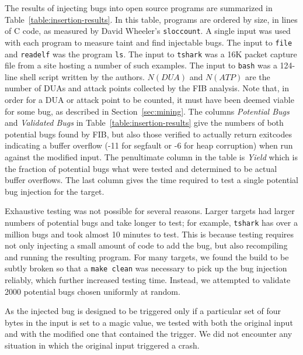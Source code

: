 The results of injecting bugs into open source programs are summarized in Table~\ref{table:insertion-results}.
In this table, programs are ordered by size, in lines of C code, as measured by David Wheeler's \verb+sloccount+.
A single input was used with each program to measure taint and find injectable bugs.
The input to \verb+file+ and \verb+readelf+ was the program \verb+ls+.
The input to \verb+tshark+ was a 16K packet capture file from a site hosting a number of such examples.  %
The input to \verb+bash+ was a 124-line shell script written by the authors.
$N(DUA)$ and $N(ATP)$ are the number of DUAs and attack points collected by the FIB analysis.
Note that, in order for a DUA or attack point to be counted, it must have been deemed viable for some bug, as described in Section~\ref{sec:mining}.
The columns \emph{Potential Bugs} and \emph{Validated Bugs} in Table~\ref{table:insertion-results} give the numbers of both potential bugs found by FIB, but also those verified to actually return exitcodes indicating a buffer overflow (-11 for segfault or -6 for heap corruption) when run against the modified input.
The penultimate column in the table is \emph{Yield} which is the fraction of potential bugs what were tested and determined to be actual buffer overflows.
The last column gives the time required to test a single potential bug injection for the target.


Exhaustive testing was not possible for several reasons.
Larger targets had larger numbers of potential bugs and take longer to test; for example, \verb+tshark+ has over a million bugs and took almost 10 minutes to test.
This is because testing requires not only injecting a small amount of code to add the bug, but also recompiling and running the resulting program.
For many targets, we found the build to be subtly broken so that a \verb+make clean+ was necessary to pick up the bug injection reliably, which further increased testing time.
Instead, we attempted to validate 2000 potential bugs chosen uniformly at random.

As the injected bug is designed to be triggered only if a particular set of four bytes in the input is set to a magic value, we tested with both the original input and with the modified one that contained the trigger. 
We did not encounter any situation in which the original input triggered a crash.

